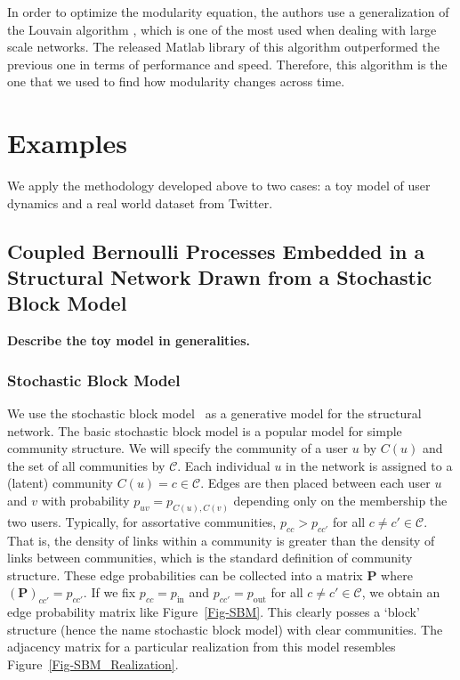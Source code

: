 \documentclass[12pt]{article}
\begin{document}
In order to optimize the modularity equation, the authors use
a generalization of the Louvain algorithm \cite{blondel2008fast}, which
is one of the most used when dealing with large scale networks.
The released Matlab library of this algorithm outperformed
the previous one in terms of performance and speed. Therefore,
this algorithm is the one that we used to find how modularity
changes across time.

\section{Examples}

We apply the methodology developed above to two cases: a toy model of user dynamics and a real world dataset from Twitter.

\subsection{Coupled Bernoulli Processes Embedded in a Structural Network Drawn from a Stochastic Block Model}

\textbf{Describe the toy model in generalities.}

\subsubsection{Stochastic Block Model}

\label{Sec-SBM}

We use the stochastic block model~\cite{holland1983stochastic} as a generative model for the structural network. The basic stochastic block model is a popular model for simple community structure. We will specify the community of a user $u$ by $C(u)$ and the set of all communities by $\mathcal{C}$. Each individual $u$ in the network is assigned to a (latent) community $C(u) = c \in \mathcal{C}$. Edges are then placed between each user $u$ and $v$ with probability $p_{uv} = p_{C(u), C(v)}$ depending only on the membership the two users. Typically, for assortative communities, $p_{cc} > p_{cc'}$ for all $c \neq c' \in \mathcal{C}$. That is, the density of links within a community is greater than the density of links between communities, which is the standard definition of community structure. These edge probabilities can be collected into a matrix $\mathbf{P}$ where $(\mathbf{P})_{cc'} = p_{cc'}.$ If we fix $p_{cc} = p_{\text{in}}$ and $p_{cc'} = p_{\text{out}}$ for all $c \neq c' \in \mathcal{C}$, we obtain an edge probability matrix like Figure~\ref{Fig-SBM}. This clearly posses a `block' structure (hence the name stochastic block model) with clear communities. The adjacency matrix for a particular realization from this model resembles Figure~\ref{Fig-SBM_Realization}.
\end{document}
